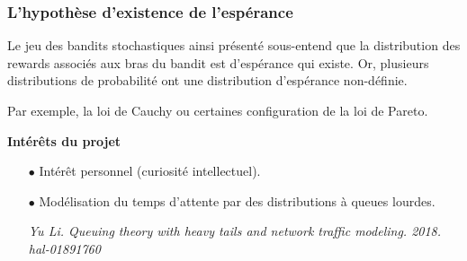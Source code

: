 \documentclass[8pt, sans]{beamer}
\begin{document}
\begin{frame}
\frametitle{L'hypothèse d'existence de l'espérance}
Le jeu des bandits stochastiques ainsi présenté sous-entend que la distribution des rewards associés aux bras du bandit est d'espérance qui existe. Or, plusieurs distributions de probabilité ont une distribution d'espérance non-définie. 

\pause
\vfill

Par exemple, la loi de Cauchy ou certaines configuration de la loi de Pareto.

\pause
\vfill

\textbf{Intérêts du projet}


\begin{itemize}
\item[$\bullet$]
Intérêt personnel (curiosité intellectuel).

\pause
\vfill

\item[$\bullet$]
Modélisation du temps d'attente par des distributions à queues lourdes.

{\it Yu Li. Queuing theory with heavy tails and network traffic modeling. 2018. hal-01891760}

\end{itemize}

\vfill

\end{frame}
\end{document}
